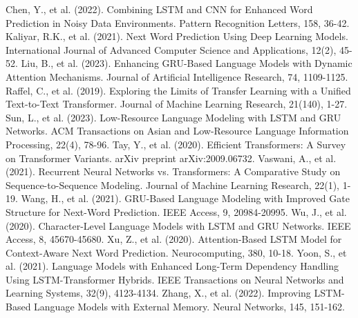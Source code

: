 \documentclass[conference]{IEEEtran}
\begin{document}
\begin{thebibliography}{00}
\bibitem{} Chen, Y., et al. (2022). Combining LSTM and CNN for Enhanced Word Prediction in Noisy Data Environments. Pattern Recognition Letters, 158, 36-42.
\bibitem{}Kaliyar, R.K., et al. (2021). Next Word Prediction Using Deep Learning Models. International Journal of Advanced Computer Science and Applications, 12(2), 45-52.
\bibitem{} Liu, B., et al. (2023). Enhancing GRU-Based Language Models with Dynamic Attention Mechanisms. Journal of Artificial Intelligence Research, 74, 1109-1125.
\bibitem{} Raffel, C., et al. (2019). Exploring the Limits of Transfer Learning with a Unified Text-to-Text Transformer. Journal of Machine Learning Research, 21(140), 1-27.   
\bibitem{} Sun, L., et al. (2023). Low-Resource Language Modeling with LSTM and GRU Networks. ACM Transactions on Asian and Low-Resource Language Information Processing, 22(4), 78-96.
\bibitem{} Tay, Y., et al. (2020). Efficient Transformers: A Survey on Transformer Variants. arXiv preprint arXiv:2009.06732.
\bibitem{} Vaswani, A., et al. (2021). Recurrent Neural Networks vs. Transformers: A Comparative Study on Sequence-to-Sequence Modeling. Journal of Machine Learning Research, 22(1), 1-19.
\bibitem{} Wang, H., et al. (2021). GRU-Based Language Modeling with Improved Gate Structure for Next-Word Prediction. IEEE Access, 9, 20984-20995.
\bibitem{} Wu, J., et al. (2020). Character-Level Language Models with LSTM and GRU Networks. IEEE Access, 8, 45670-45680.
\bibitem{} Xu, Z., et al. (2020). Attention-Based LSTM Model for Context-Aware Next Word Prediction. Neurocomputing, 380, 10-18.
\bibitem{} Yoon, S., et al. (2021). Language Models with Enhanced Long-Term Dependency Handling Using LSTM-Transformer Hybrids. IEEE Transactions on Neural Networks and Learning Systems, 32(9), 4123-4134.
\bibitem{}  Zhang, X., et al. (2022). Improving LSTM-Based Language Models with External Memory. Neural Networks, 145, 151-162.


\end{thebibliography}
\end{document}
